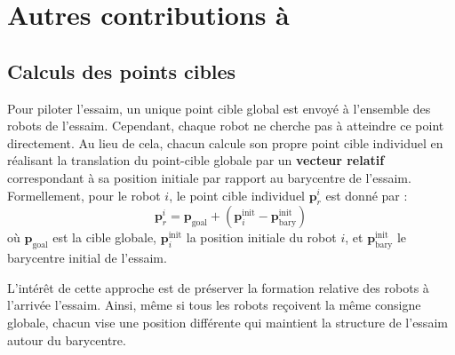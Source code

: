 \section{Autres contributions à \cite{koung_consensus-based_2020}}

\subsection{Calculs des points cibles}

Pour piloter l'essaim, un unique point cible global est envoyé à l'ensemble des robots de l'essaim. Cependant, chaque robot ne cherche pas à atteindre ce point directement. Au lieu de cela, chacun calcule son propre point cible individuel en réalisant la translation du point-cible globale par un \textbf{vecteur relatif} correspondant à sa position initiale par rapport au barycentre de l'essaim. Formellement, pour le robot $i$, le point cible individuel $\mathbf{p}_r^i$ est donné par :
\begin{equation}
\mathbf{p}_r^i = \mathbf{p}_\text{goal} + (\mathbf{p}_i^\text{init} - \mathbf{p}_\text{bary}^\text{init})
\end{equation}
où $\mathbf{p}_\text{goal}$ est la cible globale, $\mathbf{p}_i^\text{init}$ la position initiale du robot $i$, et $\mathbf{p}_\text{bary}^\text{init}$ le barycentre initial de l'essaim.

L'intérêt de cette approche est de préserver la formation relative des robots à l'arrivée l'essaim. Ainsi, même si tous les robots reçoivent la même consigne globale, chacun vise une position différente qui maintient la structure de l'essaim autour du barycentre. 

